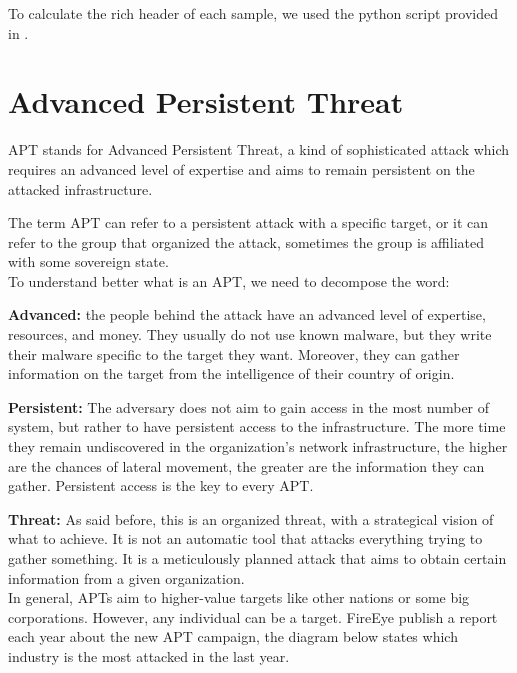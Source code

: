 To calculate the rich header of each sample, we used the python script provided in \cite{dubyk2019sans}.


\section{Advanced Persistent Threat}

APT stands for Advanced Persistent Threat, a kind of sophisticated attack which requires an advanced level of expertise and aims to remain persistent on the attacked infrastructure.

The term APT can refer to a persistent attack with a specific target, or it can refer to the group that organized the attack, sometimes the group is affiliated with some sovereign state.
\\

To understand better what is an APT, we need to decompose the word: 

\textbf{Advanced:} the people behind the attack have an advanced level of expertise, resources, and money. They usually do not use known malware, but they write their malware specific to the target they want. Moreover, they can gather information on the target from the intelligence of their country of origin.

\textbf{Persistent:}  The adversary does not aim to gain access in the most number of system, but rather to have persistent access to the infrastructure. The more time they remain undiscovered in the organization's network infrastructure, the higher are the chances of lateral movement, the greater are the information they can gather. Persistent access is the key to every APT.

\textbf{Threat:} As said before, this is an organized threat, with a strategical vision of what to achieve. It is not an automatic tool that attacks everything trying to gather something. It is a meticulously planned attack that aims to obtain certain information from a given organization. \cite{apt_def}
\\

In general, APTs aim to higher-value targets like other nations or some big corporations. However, any individual can be a target. FireEye publish a report each year about the new APT campaign, the diagram below states which industry is the most attacked in the last year.\\

